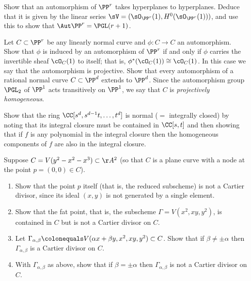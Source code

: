 \begin{exercise}\label{aut Pr}
Show that an automorphism of $\PP^r$ takes hyperplanes to hyperplanes. Deduce that it is given by the linear series
$\sV = (\sO_{\PP^r}(1), H^0(\sO_{\PP^r}(1)))$, and use this to show that $\Aut \PP^r = \PGL(r+1)$. 
\end{exercise}

\begin{exercise}\label{projective automorphism}
Let $C \subset \PP^r$ be any linearly normal curve and $\phi: C \to C$ an automorphism. Show that $\phi$ is induced by an automorphism of $\PP^r$ if and only if $\phi$ carries the invertible sheaf $\cO_{C}(1)$ to itself; that is, $\phi^*(\cO_{C}(1)) \cong \cO_{C}(1)$. In this case we say that the automorphism
is projective. Show that every automorphism of a rational normal curve $C \subset \PP^d$  extends to $\PP^d$. Since the
automorphism group $\PGL_2$ of $\PP^1$ acts transitively on $\PP^1$, we say that
$C$ is \emph{projectively homogeneous}.
\end{exercise}

\begin{exercise}\label{normality of RNC}
 Show that the ring $\CC[s^d,s^{d-1}t,\dots, t^d]$ is normal ($=$ integrally closed) by noting that its integral closure must be
 contained in $\CC[s,t]$ and then showing that if $f$ is any polynomial
 in the integral closure then the homogeneous components of $f$ are also in the integral closure.
\end{exercise}

\begin{exercise}\label{Cartier examples}
Suppose $C = V(y^2 - x^2 - x^3) \subset \AA^2$ (so that $C$ is a plane curve with a node at the point $p = (0,0) \in C$).
\begin{enumerate}
\item Show that the point $p$ itself (that is, the reduced subscheme) is not a Cartier divisor, since its ideal $(x,y)$ is not generated by a single element.
\item Show that the fat point, that is, the subscheme $\Gamma = V(x^2,
  xy, y^2)$, is contained in $C$ but is not a Cartier divisor on $C$.
\item Let $\Gamma_{\alpha, \beta} \colonequals
V(\alpha x + \beta y, x^2, xy, y^2) \subset C$.
Show that if $\beta \neq \pm \alpha$ then $\Gamma_{\alpha, \beta}$
is a Cartier divisor on $C$.
\item With $\Gamma_{\alpha, \beta}$ as above, show that if $\beta = \pm \alpha$ then $\Gamma_{\alpha, \beta}$ is not a Cartier divisor on $C$.
\end{enumerate}\label{tnih1.7}
\end{exercise}

